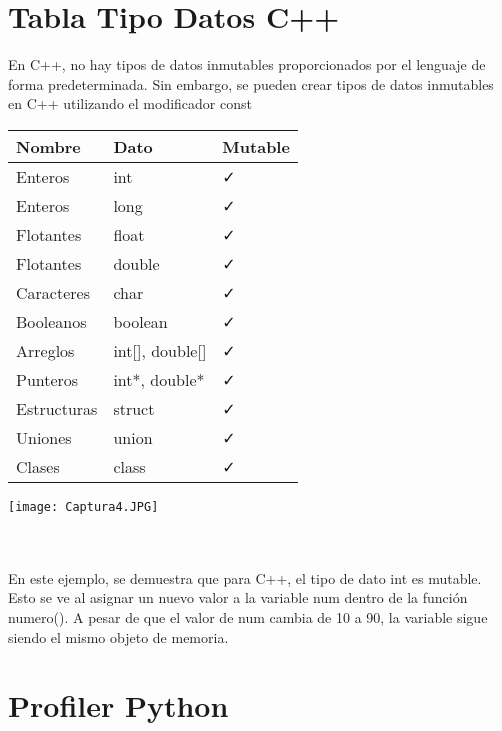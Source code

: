\documentclass{article}
\begin{document}
\section{Tabla Tipo Datos C++}
En C++, no hay tipos de datos inmutables proporcionados por el lenguaje de forma predeterminada.
Sin embargo, se pueden crear tipos de datos inmutables en C++ utilizando el modificador const 
\begin{table}[htbp]
    \centering
    \begin{tabular}{|p{3cm}|p{5cm}|p{2cm}|}
   
    \hline
    \textbf{Nombre} & \textbf{Dato} & \textbf{Mutable}  \\
    \hline
    Enteros & int & \faCheck \\
Enteros & long & \faCheck  \\
Flotantes & float & \faCheck  \\
Flotantes & double & \faCheck  \\
Caracteres & char & \faCheck  \\
Booleanos & boolean & \faCheck  \\
Arreglos & int[], double[] & \faCheck  \\
Punteros & int*, double* & \faCheck  \\
Estructuras & struct & \faCheck  \\
Uniones & union & \faCheck \\
Clases & class & \faCheck  \\

 \hline
    \end{tabular}
    \label{tab:ejemplo}
\end{table}

\begin{minipage}{0.9\textwidth}
  \centering
  \texttt{[image: Captura4.JPG]}
\end{minipage}
\hfill
\begin{minipage}{0.5\textwidth}

\end{minipage}\\
\\
En este ejemplo, se demuestra que para C++, el tipo de dato int es mutable. Esto se ve al asignar un nuevo valor a la variable num dentro de la función numero(). A pesar de que el valor de num cambia de 10 a 90, la variable sigue siendo el mismo objeto de memoria.

\newpage
\section{Profiler  Python}
\end{document}
